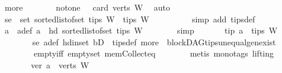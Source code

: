 \begin{isabellebody}
\ more\isanewline
\ \ \ \ \isamarkupfalse%
\ \isamarkupfalse%
\ not{\isacharunderscore}{\kern0pt}one{\isacharcolon}{\kern0pt}\ {\isachardoublequoteopen}{}\ {\isasymnoteq}\ card\ {\isacharparenleft}{\kern0pt}verts\ W{\isacharparenright}{\kern0pt}{\isachardoublequoteclose}\ \isamarkupfalse%
\ auto\isanewline
\ \ \ \ \isamarkupfalse%
\ se{\isacharcolon}{\kern0pt}\ {\isachardoublequoteopen}\ set\ {\isacharparenleft}{\kern0pt}sorted{\isacharunderscore}{\kern0pt}list{\isacharunderscore}{\kern0pt}of{\isacharunderscore}{\kern0pt}set\ {\isacharparenleft}{\kern0pt}tips\ W{\isacharparenright}{\kern0pt}{\isacharparenright}{\kern0pt}\ {\isacharequal}{\kern0pt}\ tips\ W{\isachardoublequoteclose}\ \ \isanewline
\ \ \ \ \ \ \isamarkupfalse%
\ {\isacharparenleft}{\kern0pt}simp\ add{\isacharcolon}{\kern0pt}\ tips{\isacharunderscore}{\kern0pt}def{\isacharparenright}{\kern0pt}\isanewline
\ \ \ \ \isamarkupfalse%
\ a\ \ a{\isacharunderscore}{\kern0pt}def{\isacharcolon}{\kern0pt}\ {\isachardoublequoteopen}a\ {\isacharequal}{\kern0pt}\ hd\ {\isacharparenleft}{\kern0pt}sorted{\isacharunderscore}{\kern0pt}list{\isacharunderscore}{\kern0pt}of{\isacharunderscore}{\kern0pt}set\ {\isacharparenleft}{\kern0pt}tips\ W{\isacharparenright}{\kern0pt}{\isacharparenright}{\kern0pt}{\isachardoublequoteclose}\isanewline
\ \ \ \ \ \ \isamarkupfalse%
\ simp\ \isanewline
\ \ \ \ \isamarkupfalse%
\ tip{\isacharcolon}{\kern0pt}\ {\isachardoublequoteopen}a\ {\isasymin}\ tips\ W{\isachardoublequoteclose}\ \ \isanewline
\ \ \ \ \ \ \isamarkupfalse%
\ se\ a{\isacharunderscore}{\kern0pt}def\ hd{\isacharunderscore}{\kern0pt}in{\isacharunderscore}{\kern0pt}set\ bD\ \ tips{\isacharunderscore}{\kern0pt}def\ more\ \ blockDAG{\isachardot}{\kern0pt}tips{\isacharunderscore}{\kern0pt}unequal{\isacharunderscore}{\kern0pt}gen{\isacharunderscore}{\kern0pt}exist\ \isanewline
\ \ \ \ \ \ \ \ empty{\isacharunderscore}{\kern0pt}iff\ empty{\isacharunderscore}{\kern0pt}set\ mem{\isacharunderscore}{\kern0pt}Collect{\isacharunderscore}{\kern0pt}eq\isanewline
\ \ \ \ \ \ \isamarkupfalse%
\ {\isacharparenleft}{\kern0pt}metis\ {\isacharparenleft}{\kern0pt}mono{\isacharunderscore}{\kern0pt}tags{\isacharcomma}{\kern0pt}\ lifting{\isacharparenright}{\kern0pt}{\isacharparenright}{\kern0pt}\ \ \ \ \isanewline
\ \ \ \ \isamarkupfalse%
\ \isamarkupfalse%
\ ver{\isacharcolon}{\kern0pt}\ {\isachardoublequoteopen}a\ {\isasymin}\ verts\ W{\isachardoublequoteclose}\ \isanewline

\end{isabellebody}

